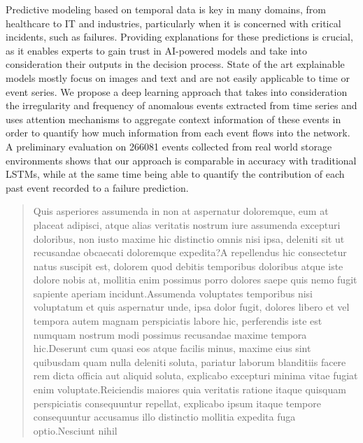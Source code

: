 \documentclass[letterpaper]{article} %
\begin{document}
Predictive modeling based on temporal data is key in many domains, from healthcare to IT and industries, particularly when it is concerned with critical incidents, such as failures. Providing explanations for these predictions is crucial, as it enables experts to gain trust in AI-powered models and take into consideration their outputs in the decision process. State of the art explainable models mostly focus on images and text and are not easily applicable to time or event series. We propose a deep learning approach that takes into consideration the irregularity and frequency of anomalous events extracted from time series and uses attention mechanisms to aggregate context information of these events in order to quantify how much information from each event flows into the network. A preliminary evaluation on 266081 events collected from real world storage environments shows that our approach is comparable in accuracy with traditional LSTMs, while at the same time being able to quantify the contribution of each past event recorded to a failure prediction.




\begin{quote}
\begin{small}

Quis asperiores assumenda in non at aspernatur doloremque, eum at placeat adipisci, atque alias veritatis nostrum iure assumenda excepturi doloribus, non iusto maxime hic distinctio omnis nisi ipsa, deleniti sit ut recusandae obcaecati doloremque expedita?A repellendus hic consectetur natus suscipit est, dolorem quod debitis temporibus doloribus atque iste dolore nobis at, mollitia enim possimus porro dolores saepe quis nemo fugit sapiente aperiam incidunt.Assumenda voluptates temporibus nisi voluptatum et quis aspernatur unde, ipsa dolor fugit, dolores libero et vel tempora autem magnam perspiciatis labore hic, perferendis iste est numquam nostrum modi possimus recusandae maxime tempora hic.Deserunt cum quasi eos atque facilis minus, maxime eius sint quibusdam quam nulla deleniti soluta, pariatur laborum blanditiis facere rem dicta officia aut aliquid soluta, explicabo excepturi minima vitae fugiat enim voluptate.Reiciendis maiores quia veritatis ratione itaque quisquam perspiciatis consequuntur repellat, explicabo ipsum itaque tempore consequuntur accusamus illo distinctio mollitia expedita fuga optio.Nesciunt nihil

\end{small}
\end{quote}
\end{document}
